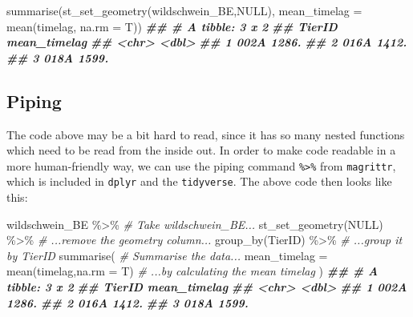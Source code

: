 \documentclass[
]{book}
\newenvironment{Shaded}{\begin{snugshade}}{\end{snugshade}}
\newcommand{\AttributeTok}[1]{\textcolor[rgb]{0.77,0.63,0.00}{#1}}
\newcommand{\CommentTok}[1]{\textcolor[rgb]{0.56,0.35,0.01}{\textit{#1}}}
\newcommand{\ConstantTok}[1]{\textcolor[rgb]{0.00,0.00,0.00}{#1}}
\newcommand{\DocumentationTok}[1]{\textcolor[rgb]{0.56,0.35,0.01}{\textbf{\textit{#1}}}}
\newcommand{\FunctionTok}[1]{\textcolor[rgb]{0.00,0.00,0.00}{#1}}
\newcommand{\NormalTok}[1]{#1}
\newcommand{\SpecialCharTok}[1]{\textcolor[rgb]{0.00,0.00,0.00}{#1}}
\begin{document}
\begin{Shaded}
\begin{Highlighting}[]

\FunctionTok{summarise}\NormalTok{(}\FunctionTok{st\_set\_geometry}\NormalTok{(wildschwein\_BE,}\ConstantTok{NULL}\NormalTok{), }\AttributeTok{mean\_timelag =} \FunctionTok{mean}\NormalTok{(timelag, }\AttributeTok{na.rm =}\NormalTok{ T))}
\DocumentationTok{\#\# \# A tibble: 3 x 2}
\DocumentationTok{\#\#   TierID mean\_timelag}
\DocumentationTok{\#\#   \textless{}chr\textgreater{}         \textless{}dbl\textgreater{}}
\DocumentationTok{\#\# 1 002A          1286.}
\DocumentationTok{\#\# 2 016A          1412.}
\DocumentationTok{\#\# 3 018A          1599.}
\end{Highlighting}
\end{Shaded}

\hypertarget{piping}{%
\subsection{Piping}\label{piping}}

The code above may be a bit hard to read, since it has so many nested functions which need to be read from the inside out. In order to make code readable in a more human-friendly way, we can use the piping command \texttt{\%\textgreater{}\%} from \texttt{magrittr}, which is included in \texttt{dplyr} and the \texttt{tidyverse}. The above code then looks like this:

\begin{Shaded}
\begin{Highlighting}[]

\NormalTok{wildschwein\_BE }\SpecialCharTok{\%\textgreater{}\%}                     \CommentTok{\# Take wildschwein\_BE...}
  \FunctionTok{st\_set\_geometry}\NormalTok{(}\ConstantTok{NULL}\NormalTok{) }\SpecialCharTok{\%\textgreater{}\%}            \CommentTok{\# ...remove the geometry column...}
  \FunctionTok{group\_by}\NormalTok{(TierID) }\SpecialCharTok{\%\textgreater{}\%}                 \CommentTok{\# ...group it by TierID}
  \FunctionTok{summarise}\NormalTok{(                           }\CommentTok{\# Summarise the data...}
    \AttributeTok{mean\_timelag =} \FunctionTok{mean}\NormalTok{(timelag,}\AttributeTok{na.rm =}\NormalTok{ T) }\CommentTok{\# ...by calculating the mean timelag}
\NormalTok{  )}
\DocumentationTok{\#\# \# A tibble: 3 x 2}
\DocumentationTok{\#\#   TierID mean\_timelag}
\DocumentationTok{\#\#   \textless{}chr\textgreater{}         \textless{}dbl\textgreater{}}
\DocumentationTok{\#\# 1 002A          1286.}
\DocumentationTok{\#\# 2 016A          1412.}
\DocumentationTok{\#\# 3 018A          1599.}
\end{Highlighting}
\end{Shaded}
\end{document}
